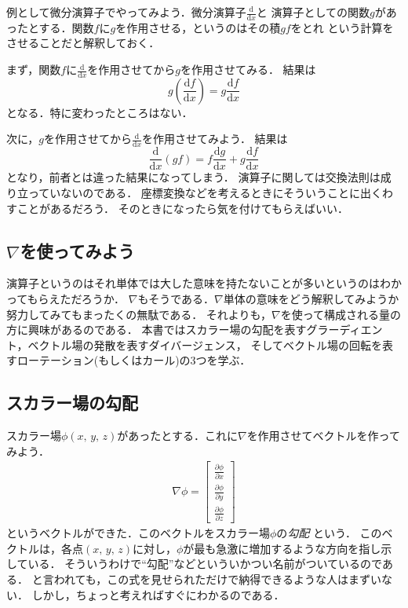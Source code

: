 例として微分演算子でやってみよう．微分演算子$\displaystyle \frac{\mathrm{d}}{\mathrm{d}x}$と
演算子としての関数$g$があったとする．関数$f$に$g$を作用させる，というのはその積$gf$をとれ
という計算をさせることだと解釈しておく．

まず，関数$f$に$\displaystyle \frac{\mathrm{d}}{\mathrm{d}x}$を作用させてから$g$を作用させてみる．
結果は
$$
g \left( \frac{\mathrm{d}f}{\mathrm{d}x} \right)  = g \frac{\mathrm{d}f}{\mathrm{d}x}
$$
となる．特に変わったところはない．

次に，$g$を作用させてから$\displaystyle \frac{\mathrm{d}}{\mathrm{d}x}$を作用させてみよう．
結果は
$$
\frac{\mathrm{d}}{\mathrm{d}x} (gf) = f \frac{\mathrm{d}g}{\mathrm{d}x} + g \frac{\mathrm{d}f}{\mathrm{d}x}
$$
となり，前者とは違った結果になってしまう．
演算子に関しては交換法則は成り立っていないのである．
座標変換などを考えるときにそういうことに出くわすことがあるだろう．
そのときになったら気を付けてもらえばいい．

\subsection{$\nabla$を使ってみよう}
演算子というのはそれ単体では大した意味を持たないことが多いというのはわかってもらえただろうか．
$\nabla$もそうである．$\nabla$単体の意味をどう解釈してみようか努力してみてもまったくの無駄である．
それよりも，$\nabla$を使って構成される量の方に興味があるのである．
本書ではスカラー場の勾配を表すグラーディエント，ベクトル場の発散を表すダイバージェンス，
そしてベクトル場の回転を表すローテーション(もしくはカール)の3つを学ぶ．

\subsection{スカラー場の勾配}
スカラー場$\phi(x, \, y, \, z)$があったとする．これに$\nabla$を作用させてベクトルを作ってみよう．
\begin{eqnarray}
\nabla \phi = \left[
 \begin{array}{c}
\displaystyle
\frac{\partial \phi}{\partial x} \\
\displaystyle
\frac{\partial \phi}{\partial y} \\
\displaystyle
\frac{\partial \phi}{\partial z} 
 \end{array}
\right]
\label{eq:gradnabla}
\end{eqnarray}
というベクトルができた．このベクトルをスカラー場$\phi$の\emph{勾配}
という．
このベクトルは，各点$(x, \, y, \, z)$に対し，$\phi$が最も急激に増加するような方向を指し示している．
そういうわけで``勾配''などといういかつい名前がついているのである．
と言われても，この式を見せられただけで納得できるような人はまずいない．
しかし，ちょっと考えればすぐにわかるのである．

